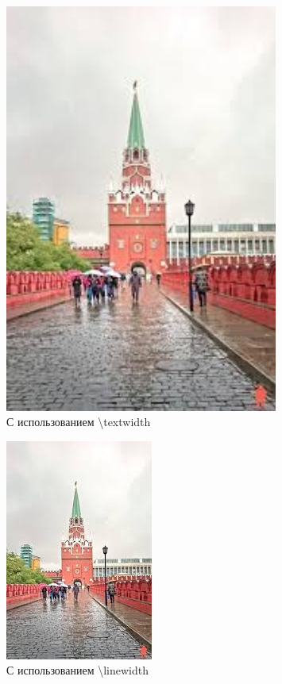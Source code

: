 \documentclass[twocolumn]{article}
\begin{document}
\lipsum[1]
\begin{figure}[ht]
    \centering
    \includegraphics[width=0.8\textwidth]{image}
    \caption{С использованием \textbackslash textwidth}
\end{figure}
\begin{figure}[ht]
    \centering
    \includegraphics[width=0.8\linewidth]{image}
    \caption{С использованием \textbackslash linewidth}
\end{figure}
\lipsum[2-5]
\end{document}
